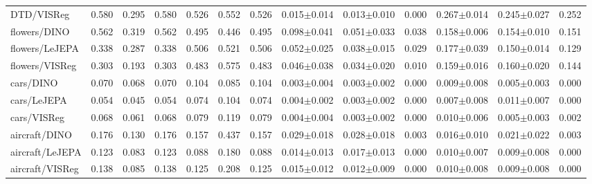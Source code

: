 \begin{landscape}
\begin{center}
\begin{longtable}{lcccccccccccc}
DTD/VISReg & 0.580 & 0.295 & 0.580 & 0.526 & 0.552 & 0.526 & 0.015$\pm$0.014 & 0.013$\pm$0.010 & 0.000 & 0.267$\pm$0.014 & 0.245$\pm$0.027 & 0.252 \\
flowers/DINO & 0.562 & 0.319 & 0.562 & 0.495 & 0.446 & 0.495 & 0.098$\pm$0.041 & 0.051$\pm$0.033 & 0.038 & 0.158$\pm$0.006 & 0.154$\pm$0.010 & 0.151 \\
flowers/LeJEPA & 0.338 & 0.287 & 0.338 & 0.506 & 0.521 & 0.506 & 0.052$\pm$0.025 & 0.038$\pm$0.015 & 0.029 & 0.177$\pm$0.039 & 0.150$\pm$0.014 & 0.129 \\
flowers/VISReg & 0.303 & 0.193 & 0.303 & 0.483 & 0.575 & 0.483 & 0.046$\pm$0.038 & 0.034$\pm$0.020 & 0.010 & 0.159$\pm$0.016 & 0.160$\pm$0.020 & 0.144 \\
cars/DINO & 0.070 & 0.068 & 0.070 & 0.104 & 0.085 & 0.104 & 0.003$\pm$0.004 & 0.003$\pm$0.002 & 0.000 & 0.009$\pm$0.008 & 0.005$\pm$0.003 & 0.000 \\
cars/LeJEPA & 0.054 & 0.045 & 0.054 & 0.074 & 0.104 & 0.074 & 0.004$\pm$0.002 & 0.003$\pm$0.002 & 0.000 & 0.007$\pm$0.008 & 0.011$\pm$0.007 & 0.000 \\
cars/VISReg & 0.068 & 0.061 & 0.068 & 0.079 & 0.119 & 0.079 & 0.004$\pm$0.004 & 0.003$\pm$0.002 & 0.000 & 0.010$\pm$0.006 & 0.005$\pm$0.003 & 0.002 \\
aircraft/DINO & 0.176 & 0.130 & 0.176 & 0.157 & 0.437 & 0.157 & 0.029$\pm$0.018 & 0.028$\pm$0.018 & 0.003 & 0.016$\pm$0.010 & 0.021$\pm$0.022 & 0.003 \\
aircraft/LeJEPA & 0.123 & 0.083 & 0.123 & 0.088 & 0.180 & 0.088 & 0.014$\pm$0.013 & 0.017$\pm$0.013 & 0.000 & 0.010$\pm$0.007 & 0.009$\pm$0.008 & 0.000 \\
aircraft/VISReg & 0.138 & 0.085 & 0.138 & 0.125 & 0.208 & 0.125 & 0.015$\pm$0.012 & 0.012$\pm$0.009 & 0.000 & 0.010$\pm$0.008 & 0.009$\pm$0.008 & 0.000 \\
\end{longtable}
\end{center}
\end{landscape}
